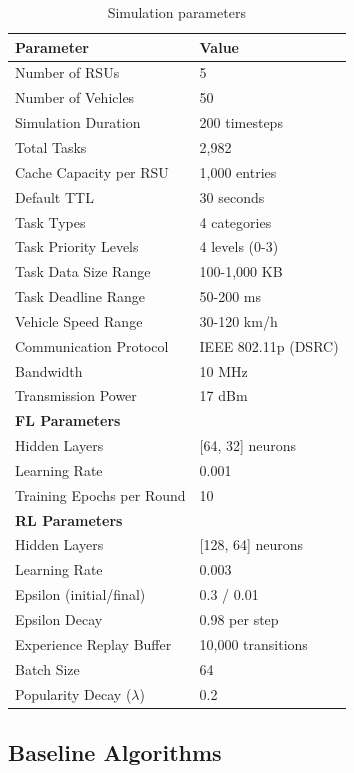 \begin{table}[t]
\centering
\caption{Simulation parameters}
\label{table:sim_params}
\small
\begin{tabular}{l|l}
\hline
\textbf{Parameter} & \textbf{Value} \\
\hline
Number of RSUs & 5 \\
Number of Vehicles & 50 \\
Simulation Duration & 200 timesteps \\
Total Tasks & 2,982 \\
Cache Capacity per RSU & 1,000 entries \\
Default TTL & 30 seconds \\
Task Types & 4 categories \\
Task Priority Levels & 4 levels (0-3) \\
Task Data Size Range & 100-1,000 KB \\
Task Deadline Range & 50-200 ms \\
Vehicle Speed Range & 30-120 km/h \\
Communication Protocol & IEEE 802.11p (DSRC) \\
Bandwidth & 10 MHz \\
Transmission Power & 17 dBm \\
\hline
\textbf{FL Parameters} & \\
\hline
Hidden Layers & [64, 32] neurons \\
Learning Rate & 0.001 \\
Training Epochs per Round & 10 \\
\hline
\textbf{RL Parameters} & \\
\hline
Hidden Layers & [128, 64] neurons \\
Learning Rate & 0.003 \\
Epsilon (initial/final) & 0.3 / 0.01 \\
Epsilon Decay & 0.98 per step \\
Experience Replay Buffer & 10,000 transitions \\
Batch Size & 64 \\
\hline
Popularity Decay ($\lambda$) & 0.2 \\
\hline
\end{tabular}
\end{table}

\subsection{Baseline Algorithms}

